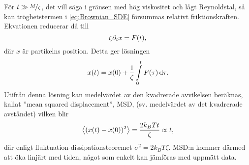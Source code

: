För $t \gg \nicefrac{M}{\zeta}$, det vill säga i gränsen med hög viskositet och lågt Reynoldstal, så kan tröghetstermen i \eqref{eq:Brownian_SDE} försummas relativt friktionskraften. Ekvationen reducerar då till
\begin{equation}
    \zeta \partial_t x=F(t),
\end{equation}
där $x$ är partikelns position. Detta ger lösningen
\begin{equation}
    x(t)=x(0)+\frac{1}{\zeta} \int^t_0 F(\tau)\id\tau.
\end{equation}
Utifrån denna lösning kan medelvärdet av den kvadrerade avvikelsen beräknas, kallat ''mean squared displacement'', MSD, (sv. medelvärdet av det kvadrerade avståndet) vilken blir 
\begin{equation}\label{eq:MSD_brown}
    \ev{(x(t)-x(0))^2}=\frac{2k_BTt}{\zeta} \propto t,
\end{equation}
där enligt fluktuation-dissipationsteoremet  $\sigma^2=2k_BT\zeta$. MSD:n kommer därmed att öka linjärt med tiden, något som enkelt kan jämföras med uppmätt data.




